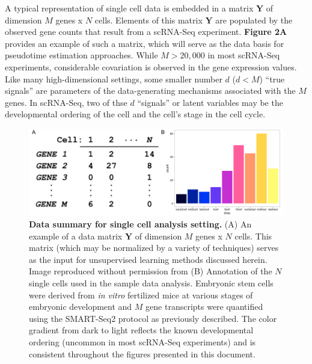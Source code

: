 \documentclass[english, 11pt]{article}\usepackage[]{graphicx}\usepackage[]{color}
\begin{document}
A typical representation of single cell data is embedded in a matrix $\mathbf{Y}$ of dimension $M$ genes x $N$ cells. Elements of this matrix $\mathbf{Y}$ are populated by the observed gene counts that result from a scRNA-Seq experiment. \textbf{Figure 2A} provides an example of such a matrix, which will serve as the data basis for pseudotime estimation approaches. While $M > 20,000$ in most scRNA-Seq experiments, considerable covariation is observed in the gene expression values. Like many high-dimensional settings, some smaller number $d$ ($d < M$) ``true signals'' are parameters of the data-generating mechanisms associated with the $M$ genes. In scRNA-Seq, two of thse $d$ ``signals'' or latent variables may be the  developmental ordering of the cell and the cell's stage in the cell cycle. \newline
\begin{figure}[H]
\begin{center}
\includegraphics[scale=0.3]{images/Figure2.png}
\end{center}
\caption{\textbf{Data summary for single cell analysis setting.} (A) An example of a data matrix $\mathbf{Y}$ of dimension $M$ genes x $N$ cells. This matrix (which may be normalized by a variety of techniques) serves as the input for unsupervised learning methods discussed herein. Image reproduced without permission from \cite{macosko2015highly} (B) Annotation of the $N$ single cells used in the sample data analysis. Embryonic stem cells were derived from \textit{in vitro} fertilized mice at various stages of embryonic development and $M$ gene transcripts were quantified using the SMART-Seq2 protocol as previously described. \cite{deng2014single} The color gradient from dark to light reflects the known developmental ordering (uncommon in most scRNA-Seq experiments) and is consistent throughout the figures presented in this document. }
\end{figure}
\end{document}
